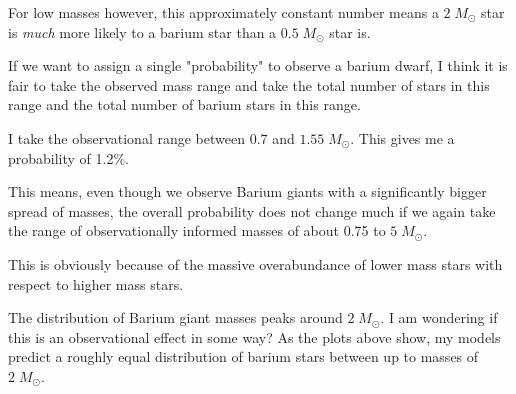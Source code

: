 \documentclass[a4paper,10pt]{article}
\begin{document}
For low masses however, this approximately constant number means a \(2\; M_\odot \) star is \emph{much} more likely to a barium star than a \(0.5\; M_\odot \) star is.

If we want to assign a single "probability" to observe a barium dwarf, I think it is fair to take the observed mass range and take the total number of stars in this range and the total number of barium stars in this range.

I take the observational range between \(0.7\) and \(1.55\; M_\odot \).
This gives me a probability of 1.2\%.

\begin{figure}[ht]
	\centering
\end{figure}

This means, even though we observe Barium giants with a significantly bigger spread of masses,
the overall probability does not change much if we again take the range of observationally informed masses
of about 0.75 to \(5\; M_\odot \).

This is obviously because of the massive overabundance of lower mass stars with respect to higher mass stars.

The distribution of Barium giant masses peaks around \(2\; M_\odot \).
I am wondering if this is
an observational effect in some way?
As the plots above show, my models predict a roughly equal distribution
of barium stars between up to masses of \(2\; M_\odot \).


\end{document}
